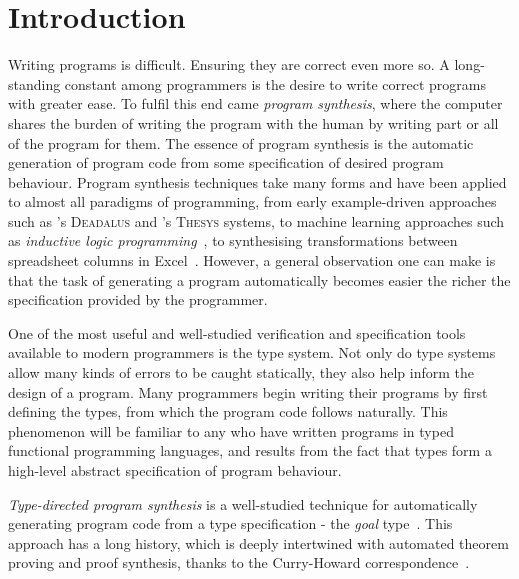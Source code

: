 \chapter{Introduction}
\label{chapter:intro}
Writing programs is difficult. Ensuring they are correct even more so. A
long-standing constant among programmers is the desire to write correct programs
with greater ease. To fulfil this end came \emph{program synthesis}, where the
computer shares the burden of writing the program with the human by writing part
or all of the program for them. The essence of program synthesis is the
automatic generation of program code from some specification of desired program
behaviour. Program synthesis techniques take many forms and have been applied to
almost all paradigms of programming, from early example-driven approaches such
as \citet{deadalus}'s \textsc{Deadalus} and \citet{10.1145/321992.322002}'s \textsc{Thesys} systems, to
machine learning approaches such as \textit{inductive logic
programming}~\citep{MUGGLETON1994629}, to synthesising transformations between
spreadsheet columns in Excel~\citep{flashfill}. However, a general observation
one can make is that the task of generating a program automatically becomes
easier the richer the specification provided by the programmer. 

One of the most useful and well-studied verification and specification tools
available to modern programmers is the type system. Not only do type systems
allow many kinds of errors to be caught statically, they also help inform the
design of a program. Many programmers begin writing their programs by first
defining the types, from which the program code follows naturally. This
phenomenon will be familiar to any who have written programs in typed functional
programming languages, and results from the fact that types form a high-level
abstract specification of program behaviour. 

\emph{Type-directed program synthesis} is a well-studied technique for
automatically generating program code from a type specification - the
\textit{goal} type~\citep{oseraMYTH1,10.1145/1809028.1806632, synthesis2,
DBLP:conf/cav/AlbarghouthiGK13, 10.1145/2737924.2737977,
osera2019constraintbased,diffprivacysynthesis, DBLP:journals/corr/abs-1904-07415}. This approach has a long history, which is deeply
intertwined with automated theorem proving and proof synthesis, thanks to the
Curry-Howard correspondence~\citep{manna1980deductive,10.5555/1624562.1624585}. 

